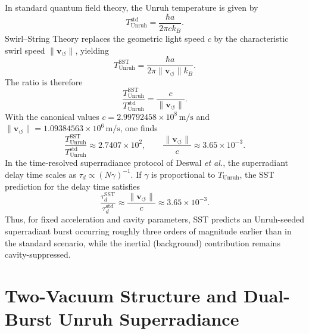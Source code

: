 \documentclass[10pt,reprint,aps,onecolumn,nofootinbib]{revtex4-2}
\newcommand{\vswirl}{\mathbf{v}_{\!\boldsymbol{\circlearrowleft}}}
\begin{document}
In standard quantum field theory, the Unruh temperature is given by
\begin{equation}
    T_{\text{Unruh}}^{\text{std}} =
    \frac{\hbar a}{2\pi c k_B}.
\end{equation}
Swirl--String Theory replaces the geometric light speed $c$ by the
characteristic swirl speed $\lVert\vswirl\rVert$, yielding
\begin{equation}
    T_{\text{Unruh}}^{\text{SST}} =
    \frac{\hbar a}{2\pi \lVert\vswirl\rVert k_B}.
\end{equation}
The ratio is therefore
\begin{equation}
    \frac{T_{\text{Unruh}}^{\text{SST}}}{T_{\text{Unruh}}^{\text{std}}}
    = \frac{c}{\lVert\vswirl\rVert}.
\end{equation}
With the canonical values $c = 2.99792458\times 10^{8}\,\mathrm{m/s}$
and $\lVert\vswirl\rVert = 1.09384563\times 10^{6}\,\mathrm{m/s}$, one finds
\begin{equation}
    \frac{T_{\text{Unruh}}^{\text{SST}}}{T_{\text{Unruh}}^{\text{std}}}
    \approx 2.7407\times 10^{2},
    \qquad
    \frac{\lVert\vswirl\rVert}{c} \approx 3.65\times 10^{-3}.
\end{equation}
In the time-resolved superradiance protocol of Deswal \emph{et al.},
the superradiant delay time scales as $\tau_d \propto (N\gamma)^{-1}$.
If $\gamma$ is proportional to $T_{\text{Unruh}}$, the SST prediction
for the delay time satisfies
\begin{equation}
    \frac{\tau_d^{\text{SST}}}{\tau_d^{\text{std}}}
    \approx \frac{\lVert\vswirl\rVert}{c}
    \approx 3.65\times 10^{-3}.
\end{equation}
Thus, for fixed acceleration and cavity parameters, SST predicts an
Unruh-seeded superradiant burst occurring roughly three orders of
magnitude earlier than in the standard scenario, while the inertial
(background) contribution remains cavity-suppressed.

\section{Two-Vacuum Structure and Dual-Burst Unruh Superradiance}
\label{sec:sst_two_vacua_unruh}
\end{document}
